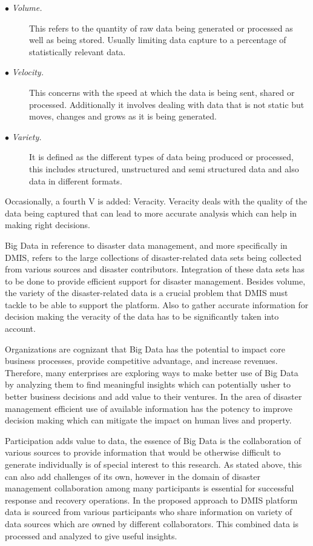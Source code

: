 \begin{description}
	
	\item[$\bullet$ \it Volume.]
	\hfill\break
	This refers to the quantity of raw data being generated or processed as well as being stored. Usually  limiting data capture to a percentage of statistically relevant data.
	
	\item[$\bullet$ \it Velocity.]
	\hfill\break
	This concerns with the speed at which the data is being sent, shared or  processed. Additionally it involves dealing with data that is not static but moves, changes and grows as it is being generated.
		
	\item[$\bullet$ \it Variety.]
	\hfill\break
	It is defined as the different types of data being produced or processed, this includes structured, unstructured and semi structured data and also data in different formats.
\end{description}

Occasionally, a fourth V is added: Veracity. Veracity deals with the quality of the data being captured that can lead to more accurate analysis which can help in making right decisions.

Big Data in reference to disaster data management, and more specifically in DMIS, refers to  the large collections of disaster-related data sets being collected from various sources and disaster contributors. Integration of these data sets has to be done to provide efficient support for disaster management. Besides volume, the variety of the disaster-related data is a crucial problem that DMIS must tackle to be able to support the platform. Also to gather accurate information for decision making the veracity of the data has to be significantly taken into account.

Organizations are cognizant that Big Data has the potential to impact core business processes, provide competitive advantage, and increase revenues. Therefore, many enterprises are exploring ways to make better use of Big Data by analyzing them to find meaningful insights which can potentially usher to better business decisions and add value to their ventures. In the area of disaster management efficient use of available information has the potency to improve decision making which can mitigate the impact on human lives and property.

Participation adds value to data, the essence of Big Data is the collaboration of various sources to provide information that would be otherwise difficult to generate individually is of special interest to this research. As stated above, this can also add challenges of its own, however in the domain of disaster management collaboration among many participants is essential for successful response and recovery operations. In the proposed approach to DMIS platform data is sourced from various participants who share information on variety of data sources which are owned by different collaborators. This combined data is processed and analyzed to give useful insights.

